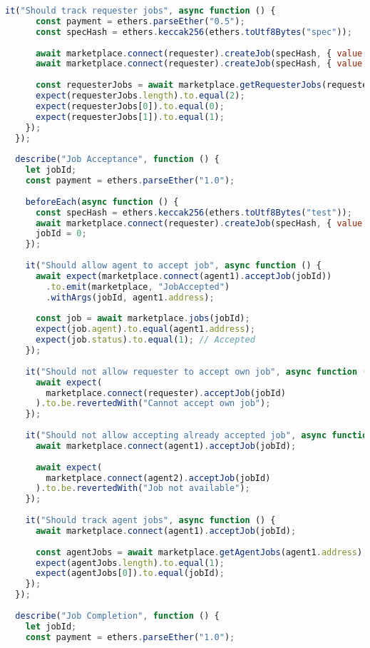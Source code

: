\begin{lstlisting}[language=JavaScript,caption={Complete test suite for smart contracts}]
    it("Should track requester jobs", async function () {
      const payment = ethers.parseEther("0.5");
      const specHash = ethers.keccak256(ethers.toUtf8Bytes("spec"));
      
      await marketplace.connect(requester).createJob(specHash, { value: payment });
      await marketplace.connect(requester).createJob(specHash, { value: payment });
      
      const requesterJobs = await marketplace.getRequesterJobs(requester.address);
      expect(requesterJobs.length).to.equal(2);
      expect(requesterJobs[0]).to.equal(0);
      expect(requesterJobs[1]).to.equal(1);
    });
  });
  
  describe("Job Acceptance", function () {
    let jobId;
    const payment = ethers.parseEther("1.0");
    
    beforeEach(async function () {
      const specHash = ethers.keccak256(ethers.toUtf8Bytes("test"));
      await marketplace.connect(requester).createJob(specHash, { value: payment });
      jobId = 0;
    });
    
    it("Should allow agent to accept job", async function () {
      await expect(marketplace.connect(agent1).acceptJob(jobId))
        .to.emit(marketplace, "JobAccepted")
        .withArgs(jobId, agent1.address);
      
      const job = await marketplace.jobs(jobId);
      expect(job.agent).to.equal(agent1.address);
      expect(job.status).to.equal(1); // Accepted
    });
    
    it("Should not allow requester to accept own job", async function () {
      await expect(
        marketplace.connect(requester).acceptJob(jobId)
      ).to.be.revertedWith("Cannot accept own job");
    });
    
    it("Should not allow accepting already accepted job", async function () {
      await marketplace.connect(agent1).acceptJob(jobId);
      
      await expect(
        marketplace.connect(agent2).acceptJob(jobId)
      ).to.be.revertedWith("Job not available");
    });
    
    it("Should track agent jobs", async function () {
      await marketplace.connect(agent1).acceptJob(jobId);
      
      const agentJobs = await marketplace.getAgentJobs(agent1.address);
      expect(agentJobs.length).to.equal(1);
      expect(agentJobs[0]).to.equal(jobId);
    });
  });
  
  describe("Job Completion", function () {
    let jobId;
    const payment = ethers.parseEther("1.0");
    

\end{lstlisting}
